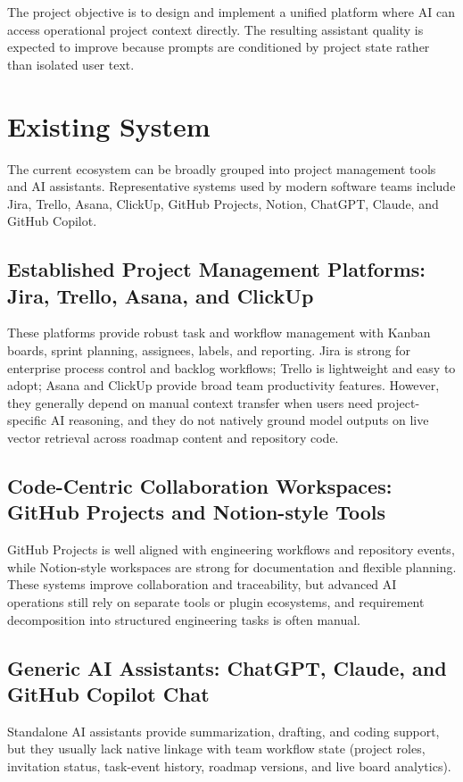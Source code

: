 \documentclass[a4paper, 11pt, oneside]{Dissertation}
\begin{document}
The project objective is to design and implement a unified platform where AI can access operational project context directly. The resulting assistant quality is expected to improve because prompts are conditioned by project state rather than isolated user text.

\section{Existing System}
The current ecosystem can be broadly grouped into project management tools and AI assistants. Representative systems used by modern software teams include Jira, Trello, Asana, ClickUp, GitHub Projects, Notion, ChatGPT, Claude, and GitHub Copilot.

\subsection{Established Project Management Platforms: Jira, Trello, Asana, and ClickUp}
These platforms provide robust task and workflow management with Kanban boards, sprint planning, assignees, labels, and reporting. Jira is strong for enterprise process control and backlog workflows; Trello is lightweight and easy to adopt; Asana and ClickUp provide broad team productivity features. However, they generally depend on manual context transfer when users need project-specific AI reasoning, and they do not natively ground model outputs on live vector retrieval across roadmap content and repository code.

\subsection{Code-Centric Collaboration Workspaces: GitHub Projects and Notion-style Tools}
GitHub Projects is well aligned with engineering workflows and repository events, while Notion-style workspaces are strong for documentation and flexible planning. These systems improve collaboration and traceability, but advanced AI operations still rely on separate tools or plugin ecosystems, and requirement decomposition into structured engineering tasks is often manual.

\subsection{Generic AI Assistants: ChatGPT, Claude, and GitHub Copilot Chat}
Standalone AI assistants provide summarization, drafting, and coding support, but they usually lack native linkage with team workflow state (project roles, invitation status, task-event history, roadmap versions, and live board analytics).
\end{document}
